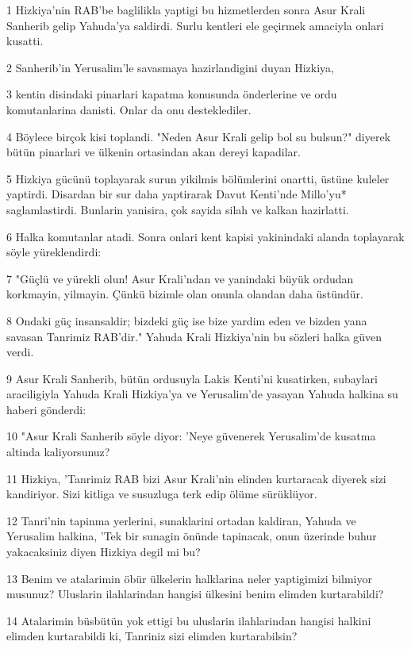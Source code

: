 \par 1 Hizkiya'nin RAB'be baglilikla yaptigi bu hizmetlerden sonra Asur Krali Sanherib gelip Yahuda'ya saldirdi. Surlu kentleri ele geçirmek amaciyla onlari kusatti.
\par 2 Sanherib'in Yerusalim'le savasmaya hazirlandigini duyan Hizkiya,
\par 3 kentin disindaki pinarlari kapatma konusunda önderlerine ve ordu komutanlarina danisti. Onlar da onu desteklediler.
\par 4 Böylece birçok kisi toplandi. "Neden Asur Krali gelip bol su bulsun?" diyerek bütün pinarlari ve ülkenin ortasindan akan dereyi kapadilar.
\par 5 Hizkiya gücünü toplayarak surun yikilmis bölümlerini onartti, üstüne kuleler yaptirdi. Disardan bir sur daha yaptirarak Davut Kenti'nde Millo'yu* saglamlastirdi. Bunlarin yanisira, çok sayida silah ve kalkan hazirlatti.
\par 6 Halka komutanlar atadi. Sonra onlari kent kapisi yakinindaki alanda toplayarak söyle yüreklendirdi:
\par 7 "Güçlü ve yürekli olun! Asur Krali'ndan ve yanindaki büyük ordudan korkmayin, yilmayin. Çünkü bizimle olan onunla olandan daha üstündür.
\par 8 Ondaki güç insansaldir; bizdeki güç ise bize yardim eden ve bizden yana savasan Tanrimiz RAB'dir." Yahuda Krali Hizkiya'nin bu sözleri halka güven verdi.
\par 9 Asur Krali Sanherib, bütün ordusuyla Lakis Kenti'ni kusatirken, subaylari araciligiyla Yahuda Krali Hizkiya'ya ve Yerusalim'de yasayan Yahuda halkina su haberi gönderdi:
\par 10 "Asur Krali Sanherib söyle diyor: 'Neye güvenerek Yerusalim'de kusatma altinda kaliyorsunuz?
\par 11 Hizkiya, 'Tanrimiz RAB bizi Asur Krali'nin elinden kurtaracak diyerek sizi kandiriyor. Sizi kitliga ve susuzluga terk edip ölüme sürüklüyor.
\par 12 Tanri'nin tapinma yerlerini, sunaklarini ortadan kaldiran, Yahuda ve Yerusalim halkina, 'Tek bir sunagin önünde tapinacak, onun üzerinde buhur yakacaksiniz diyen Hizkiya degil mi bu?
\par 13 Benim ve atalarimin öbür ülkelerin halklarina neler yaptigimizi bilmiyor musunuz? Uluslarin ilahlarindan hangisi ülkesini benim elimden kurtarabildi?
\par 14 Atalarimin büsbütün yok ettigi bu uluslarin ilahlarindan hangisi halkini elimden kurtarabildi ki, Tanriniz sizi elimden kurtarabilsin?
